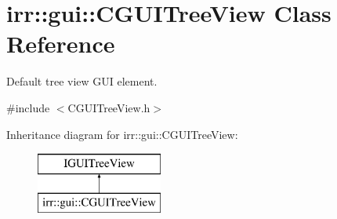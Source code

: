 \hypertarget{classirr_1_1gui_1_1_c_g_u_i_tree_view}{\section{irr\-:\-:gui\-:\-:C\-G\-U\-I\-Tree\-View Class Reference}
\label{classirr_1_1gui_1_1_c_g_u_i_tree_view}
}


Default tree view G\-U\-I element.  




{\ttfamily \#include $<$C\-G\-U\-I\-Tree\-View.\-h$>$}

Inheritance diagram for irr\-:\-:gui\-:\-:C\-G\-U\-I\-Tree\-View\-:\begin{figure}[H]
\begin{center}
\leavevmode
\includegraphics[height=2.000000cm]{classirr_1_1gui_1_1_c_g_u_i_tree_view}
\end{center}
\end{figure}
